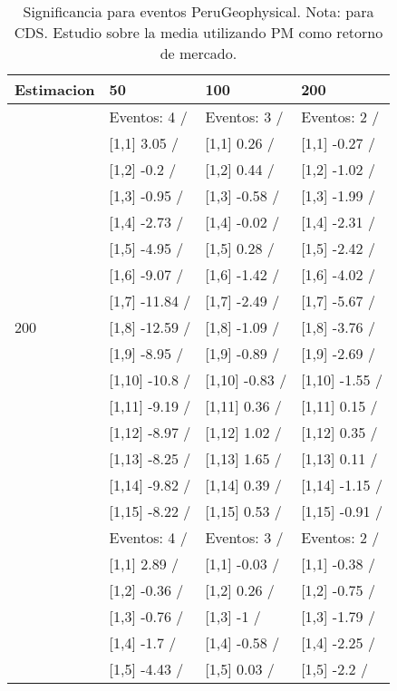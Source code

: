 \begin{table}

\caption{Significancia para eventos PeruGeophysical. Nota: para CDS. Estudio sobre la media utilizando PM como retorno de mercado.}
\centering
\begin{tabular}[t]{llll}
\toprule
Estimacion & 50 & 100 & 200\\
\midrule
 & Eventos:  4 / & Eventos:  3 / & Eventos:  2 /\\
 & {}[1,1] 3.05  / & {}[1,1] 0.26  / & {}[1,1] -0.27  /\\
 & {}[1,2] -0.2  / & {}[1,2] 0.44  / & {}[1,2] -1.02  /\\
 & {}[1,3] -0.95  / & {}[1,3] -0.58  / & {}[1,3] -1.99  /\\
 & {}[1,4] -2.73  / & {}[1,4] -0.02  / & {}[1,4] -2.31  /\\
\addlinespace
 & {}[1,5] -4.95  / & {}[1,5] 0.28  / & {}[1,5] -2.42  /\\
 & {}[1,6] -9.07  / & {}[1,6] -1.42  / & {}[1,6] -4.02  /\\
 & {}[1,7] -11.84  / & {}[1,7] -2.49  / & {}[1,7] -5.67  /\\
200 & {}[1,8] -12.59  / & {}[1,8] -1.09  / & {}[1,8] -3.76  /\\
 & {}[1,9] -8.95  / & {}[1,9] -0.89  / & {}[1,9] -2.69  /\\
\addlinespace
 & {}[1,10] -10.8  / & {}[1,10] -0.83  / & {}[1,10] -1.55  /\\
 & {}[1,11] -9.19  / & {}[1,11] 0.36  / & {}[1,11] 0.15  /\\
 & {}[1,12] -8.97  / & {}[1,12] 1.02  / & {}[1,12] 0.35  /\\
 & {}[1,13] -8.25  / & {}[1,13] 1.65  / & {}[1,13] 0.11  /\\
 & {}[1,14] -9.82  / & {}[1,14] 0.39  / & {}[1,14] -1.15  /\\
\addlinespace
 & {}[1,15] -8.22  / & {}[1,15] 0.53  / & {}[1,15] -0.91  /\\
 & Eventos:  4 / & Eventos:  3 / & Eventos:  2 /\\
 & {}[1,1] 2.89  / & {}[1,1] -0.03  / & {}[1,1] -0.38  /\\
 & {}[1,2] -0.36  / & {}[1,2] 0.26  / & {}[1,2] -0.75  /\\
 & {}[1,3] -0.76  / & {}[1,3] -1  / & {}[1,3] -1.79  /\\
\addlinespace
 & {}[1,4] -1.7  / & {}[1,4] -0.58  / & {}[1,4] -2.25  /\\
 & {}[1,5] -4.43  / & {}[1,5] 0.03  / & {}[1,5] -2.2  /\\

\end{tabular}
\end{table}
